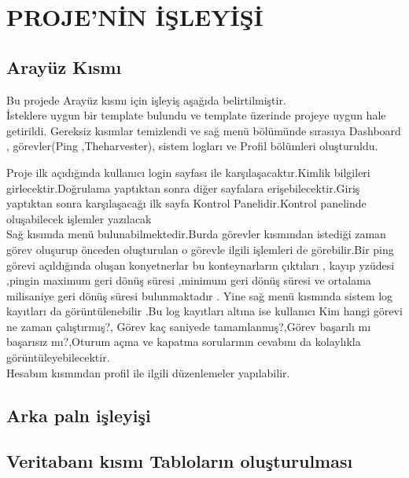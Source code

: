 \section{PROJE'NİN İŞLEYİŞİ}
\subsection{Arayüz Kısmı }
Bu projede  Arayüz  kısmı için işleyiş aşağıda belirtilmiştir.  \\
İsteklere uygun bir template bulundu ve template üzerinde projeye uygun hale getirildi. Gereksiz kısımlar temizlendi ve sağ menü bölümünde sırasıya Dashboard , görevler(Ping ,Theharvester), sistem logları ve Profil   bölümleri oluşturuldu. 

Proje ilk açıdığında kullanıcı login sayfası ile karşılaşacaktır.Kimlik bilgileri girlecektir.Doğrulama yaptıktan sonra diğer sayfalara erişebilecektir.Giriş yaptıktan sonra karşılaşacağı ilk sayfa  Kontrol Panelidir.Kontrol panelinde oluşabilecek işlemler yazılacak\\
Sağ kısımda menü bulunabilmektedir.Burda görevler kısmından istediği zaman görev oluşurup önceden oluşturulan o görevle ilgili işlemleri  de görebilir.Bir ping görevi  açıldığında oluşan konyetnerlar bu  konteynarların çıktıları , kayıp yzüdesi ,pingin maximum  geri dönüş süresi ,minimum geri dönüş süresi ve  ortalama milisaniye geri dönüş süresi bulunmaktadır .%
 Yine sağ menü kısmında sistem log kayıtları da görüntülenebilir .Bu log kayıtları altına ise kullanıcı Kim hangi görevi ne zaman çalıştırmış?, Görev kaç saniyede tamamlanmış?,Görev başarılı mı başarısız mı?,Oturum açma ve kapatma sorularının cevabını da kolaylıkla görüntüleyebilecektir.\\
Hesabım kısmından profil ile  ilgili düzenlemeler yapılabilir.

\subsection{Arka paln işleyişi}

 \subsection {Veritabanı kısmı Tabloların oluşturulması }
 